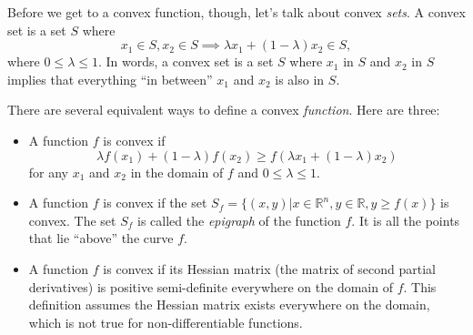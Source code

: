 Before we get to a convex function, though, let's talk about convex \emph{sets}. A convex set is a set $S$ where $$x_1 \in S, x_2 \in S \implies \lambda x_1 + (1 - \lambda) x_2 \in S,$$ where $0 \leq \lambda \leq 1$. In words, a convex set is a set $S$ where $x_1$ in $S$ and $x_2$ in $S$ implies that everything ``in between'' $x_1$ and $x_2$ is also in $S$.

There are several equivalent ways to define a convex \emph{function}. Here are three:
\begin{itemize}
	\item A function $f$ is convex if $$\lambda f(x_1) + (1 - \lambda) f(x_2) \geq f(\lambda x_1 + (1-\lambda) x_2)$$ for any $x_1$ and $x_2$ in the domain of $f$ and $0 \leq \lambda \leq 1$.
	\item A function $f$ is convex if the set $S_f = \{(x, y)|x \in \mathbb{R}^n, y \in \mathbb{R}, y \geq f(x)\}$ is convex. The set $S_f$ is called the \emph{epigraph} of the function $f$. It is all the points that lie ``above'' the curve $f$.
	\item A function $f$ is convex if its Hessian matrix (the matrix of second partial derivatives) is positive semi-definite everywhere on the domain of $f$. This definition assumes the Hessian matrix exists everywhere on the domain, which is not true for non-differentiable functions.
\end{itemize}

